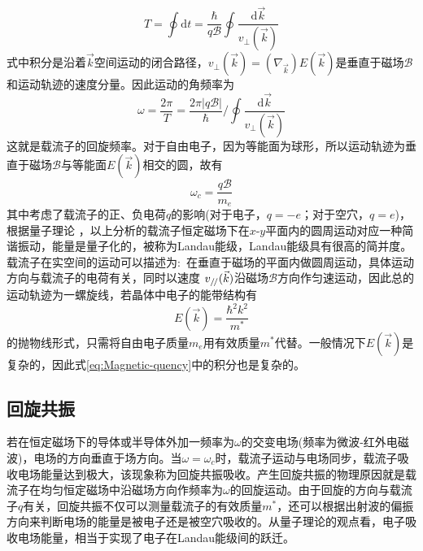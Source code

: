 \begin{equation}
	T=\oint\mathrm{d}t=\dfrac{\hbar}{q\mathscr{B}}\oint\dfrac{\mathrm{d}\vec k}{v_{\perp}(\vec k)}
	\label{eq:Magnet-Time}
\end{equation}
式中积分是沿着$\vec k$空间运动的闭合路径，$v_{\perp}(\vec k)=(\nabla_{\vec k})E(\vec k)$是垂直于磁场$\mathscr{B}$和运动轨迹的速度分量。因此运动的角频率为
\begin{equation}
	\omega=\dfrac{2\pi}{T}=\dfrac{2\pi|q\mathscr{B}|}{\hbar}/\oint\dfrac{\mathrm{d}\vec k}{v_{\perp}(\vec k)}
	\label{eq:Magnetic-quency}
\end{equation}
这就是载流子的回旋频率。对于自由电子，因为等能面为球形，所以运动轨迹为垂直于磁场$\mathscr{B}$与等能面$E(\vec k)$相交的圆，故有
\begin{equation}
	\omega_c=\dfrac{q\mathscr{B}}{m_e}
	\label{eq:Magnetic-circle-quency}
\end{equation}
其中考虑了载流子的正、负电荷$q$的影响(对于电子，$q=-e$；对于空穴，$q=e$)，根据量子理论%
，以上分析的载流子恒定磁场下在$x$-$y$平面内的圆周运动对应一种简谐振动，能量是量子化的，被称为Landau能级，Landau能级具有很高的简并度。载流子在实空间的运动可以描述为:~在垂直于磁场的平面内做圆周运动，具体运动方向与载流子的电荷有关，同时以速度%
$v_{\mathrel{/\mskip-2.5mu/}}(\vec k)$沿磁场$\mathscr{B}$方向作匀速运动，因此总的运动轨迹为一螺旋线，若晶体中电子的能带结构有
\begin{equation}
	E(\vec k)=\dfrac{\hbar^2k^2}{m^{\ast}}
	\label{eq:like-Free_electron-energy}
\end{equation}
的抛物线形式，只需将自由电子质量$m_e$用有效质量$m^{\ast}$代替。一般情况下$E(\vec k)$是复杂的，因此式\ref{eq:Magnetic-quency}中的积分也是复杂的。

\subsection{回旋共振}\label{Band:Hall_effect}
若在恒定磁场下的导体或半导体外加一频率为$\omega$的交变电场(频率为微波-红外电磁波)，电场的方向垂直于场方向。当$\omega=\omega_c$时，载流子运动与电场同步，载流子吸收电场能量达到极大，该现象称为回旋共振吸收。产生回旋共振的物理原因就是载流子在均匀恒定磁场中沿磁场方向作频率为$\omega$的回旋运动。由于回旋的方向与载流子$q$有关，回旋共振不仅可以测量载流子的有效质量$m^{\ast}$，还可以根据出射波的偏振方向来判断电场的能量是被电子还是被空穴吸收的。从量子理论的观点看，电子吸收电场能量，相当于实现了电子在Landau能级间的跃迁。

